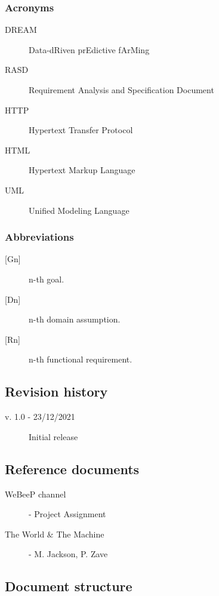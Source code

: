 \subsubsection{Acronyms}

\begin{description}
    \item [DREAM] Data-dRiven prEdictive fArMing
    \item [RASD] Requirement Analysis and Specification Document
    \item [HTTP] Hypertext Transfer Protocol
    \item [HTML] Hypertext Markup Language
    \item [UML] Unified Modeling Language
\end{description}

\subsubsection{Abbreviations}

\begin{description}
    \item [{[Gn]}] n-th goal.
    \item [{[Dn]}] n-th domain assumption.
    \item [{[Rn]}] n-th functional requirement.
\end{description}

\bigskip
\subsection{Revision history}

\begin{description}
    \item[v. 1.0 - 23/12/2021] Initial release
\end{description} 

\bigskip
\subsection{Reference documents}

\begin{description}
    \item [WeBeeP channel] - Project Assignment
    \item [The World \& The Machine] - M. Jackson, P. Zave 
\end{description}

\bigskip
\subsection{Document structure}

